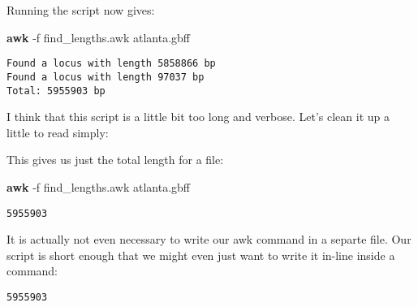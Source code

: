 \documentclass[
]{book}
\newenvironment{Shaded}{\begin{snugshade}}{\end{snugshade}}
\newcommand{\AttributeTok}[1]{\textcolor[rgb]{0.13,0.29,0.53}{#1}}
\newcommand{\ControlFlowTok}[1]{\textcolor[rgb]{0.13,0.29,0.53}{\textbf{#1}}}
\newcommand{\DataTypeTok}[1]{\textcolor[rgb]{0.13,0.29,0.53}{#1}}
\newcommand{\FunctionTok}[1]{\textcolor[rgb]{0.13,0.29,0.53}{\textbf{#1}}}
\newcommand{\KeywordTok}[1]{\textcolor[rgb]{0.13,0.29,0.53}{\textbf{#1}}}
\newcommand{\NormalTok}[1]{#1}
\newcommand{\OperatorTok}[1]{\textcolor[rgb]{0.81,0.36,0.00}{\textbf{#1}}}
\newcommand{\OtherTok}[1]{\textcolor[rgb]{0.56,0.35,0.01}{#1}}
\newcommand{\SpecialStringTok}[1]{\textcolor[rgb]{0.31,0.60,0.02}{#1}}
\newcommand{\StringTok}[1]{\textcolor[rgb]{0.31,0.60,0.02}{#1}}
\begin{document}
Running the script now gives:

\begin{Shaded}
\begin{Highlighting}[]
\FunctionTok{awk} \AttributeTok{{-}f}\NormalTok{ find\_lengths.awk atlanta.gbff}
\end{Highlighting}
\end{Shaded}

\begin{verbatim}
Found a locus with length 5858866 bp
Found a locus with length 97037 bp
Total: 5955903 bp
\end{verbatim}

I think that this script is a little bit too long and verbose. Let's clean it up a little to read simply:

\begin{Shaded}
\end{Shaded}

This gives us just the total length for a file:

\begin{Shaded}
\begin{Highlighting}[]
\FunctionTok{awk} \AttributeTok{{-}f}\NormalTok{ find\_lengths.awk atlanta.gbff}
\end{Highlighting}
\end{Shaded}

\begin{verbatim}
5955903
\end{verbatim}

It is actually not even necessary to write our awk command in a separte file. Our script is short enough that we might even just want to write it in-line inside a command:

\begin{Shaded}
\end{Shaded}

\begin{verbatim}
5955903
\end{verbatim}
\end{document}

